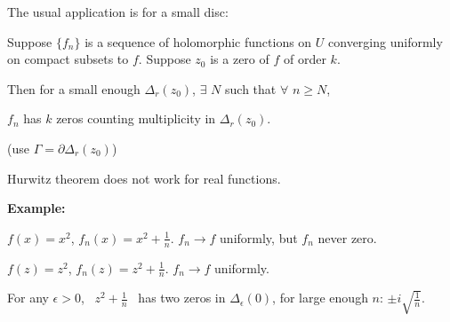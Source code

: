 \documentclass[10pt,aspectratio=169]{beamer}
\begin{document}
\begin{frame}
The usual application is for a small disc:

\medskip
\pause

Suppose $\{ f_n \}$ is a sequence of holomorphic
functions on $U$ converging uniformly
on compact subsets to $f$.
\pause
Suppose $z_0$ is a zero of
$f$ of order $k$.

\medskip
\pause
Then for a small enough $\Delta_r(z_0)$,
$\exists$ $N$ such that
$\forall$ $n \geq N$,

$f_n$ has $k$ zeros counting multiplicity in
$\Delta_r(z_0)$.

(use $\Gamma = \partial \Delta_r(z_0)$)

\bigskip
\pause

Hurwitz theorem does not work for real functions.

\medskip
\pause

\textbf{Example:}

$f(x) = x^2$, \quad $f_n(x) = x^2+\frac{1}{n}$.  \quad $f_n \to f$ uniformly, but
$f_n$ never zero.

\medskip
\pause

$f(z) = z^2$, \quad $f_n(z) = z^2+\frac{1}{n}$.  \quad $f_n \to f$ uniformly.

\pause
\medskip

For any $\epsilon > 0$, ~$z^2+\frac{1}{n}$~ has
two zeros in $\Delta_\epsilon(0)$, for large enough $n$:
\quad
$\pm i \sqrt{\frac{1}{n}}$.
\end{frame}
\end{document}
